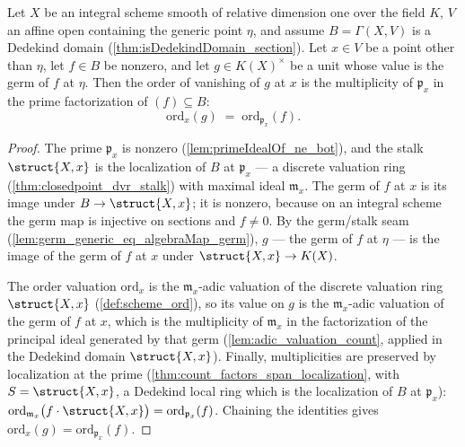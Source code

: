 \begin{theorem}
  \label{thm:toAdd_ordZ_eq_count_factors}
  \leanok
  Let \(X\) be an integral scheme smooth of relative dimension one over the field
  \(K\), \(V\) an affine open containing the generic point \(\eta\), and assume
  \(B = \Gamma(X, V)\) is a Dedekind domain (\ref{thm:isDedekindDomain_section}). Let
  \(x \in V\) be a point other than \(\eta\), let \(f \in B\) be nonzero, and let
  \(g \in K(X)^\times\) be a unit whose value is the germ of \(f\) at \(\eta\). Then
  the order of vanishing of \(g\) at \(x\) is the multiplicity of \(\mathfrak p_x\) in
  the prime factorization of \((f) \subseteq B\):
  \[
    \mathrm{ord}_x(g) \;=\; \mathrm{ord}_{\mathfrak p_x}(f) .
  \]
\end{theorem}
\begin{proof}
  \leanok
  The prime \(\mathfrak p_x\) is nonzero (\ref{lem:primeIdealOf_ne_bot}), and the
  stalk \(\struct{X,x}\) is the localization of \(B\) at \(\mathfrak p_x\) --- a
  discrete valuation ring (\ref{thm:closedpoint_dvr_stalk}) with maximal ideal
  \(\mathfrak m_x\). The germ of \(f\) at \(x\) is its image under
  \(B \to \struct{X,x}\); it is nonzero, because on an integral scheme the germ map is
  injective on sections and \(f \neq 0\). By the germ/stalk seam
  (\ref{lem:germ_generic_eq_algebraMap_germ}), \(g\) --- the germ of \(f\) at
  \(\eta\) --- is the image of the germ of \(f\) at \(x\) under
  \(\struct{X,x} \to K(X)\).

  The order valuation \(\mathrm{ord}_x\) is the \(\mathfrak m_x\)-adic valuation of
  the discrete valuation ring \(\struct{X,x}\) (\ref{def:scheme_ord}), so its value on
  \(g\) is the \(\mathfrak m_x\)-adic valuation of the germ of \(f\) at \(x\), which
  is the multiplicity of \(\mathfrak m_x\) in the factorization of the principal
  ideal generated by that germ (\ref{lem:adic_valuation_count}, applied in the
  Dedekind domain \(\struct{X,x}\)). Finally, multiplicities are preserved by
  localization at the prime (\ref{thm:count_factors_span_localization}, with
  \(S = \struct{X,x}\), a Dedekind local ring which is the localization of \(B\) at
  \(\mathfrak p_x\)):
  \(\mathrm{ord}_{\mathfrak m_x}\bigl(f \cdot \struct{X,x}\bigr)
  = \mathrm{ord}_{\mathfrak p_x}(f)\). Chaining the identities gives
  \(\mathrm{ord}_x(g) = \mathrm{ord}_{\mathfrak p_x}(f)\).
\end{proof}

